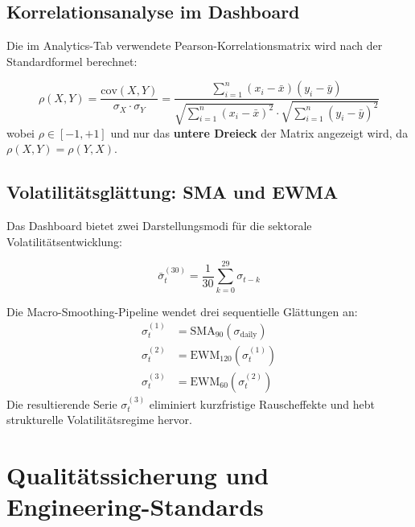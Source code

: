 \documentclass[12pt, a4paper, oneside]{report}
\begin{document}
\section{Korrelationsanalyse im Dashboard}

Die im Analytics-Tab verwendete Pearson-Korrelationsmatrix wird nach der Standardformel berechnet:

\begin{mathbox}
\[
  \rho(X, Y) = \frac{\text{cov}(X, Y)}{\sigma_X \cdot \sigma_Y} = \frac{\sum_{i=1}^{n}(x_i - \bar{x})(y_i - \bar{y})}{\sqrt{\sum_{i=1}^{n}(x_i - \bar{x})^2} \cdot \sqrt{\sum_{i=1}^{n}(y_i - \bar{y})^2}}
\]
wobei $\rho \in [-1, +1]$ und nur das \textbf{untere Dreieck} der Matrix angezeigt wird, da $\rho(X,Y) = \rho(Y,X)$.
\end{mathbox}

\section{Volatilitätsglättung: SMA und EWMA}

Das Dashboard bietet zwei Darstellungsmodi für die sektorale Volatilitätsentwicklung:

\begin{mathbox}
\[
  \bar{\sigma}_{t}^{(30)} = \frac{1}{30}\sum_{k=0}^{29} \sigma_{t-k}
\]
\end{mathbox}

\begin{mathbox}
Die Macro-Smoothing-Pipeline wendet drei sequentielle Glättungen an:
\begin{align}
  \sigma_t^{(1)} &= \text{SMA}_{90}(\sigma_{\text{daily}}) \\
  \sigma_t^{(2)} &= \text{EWM}_{120}\!\left(\sigma_t^{(1)}\right) \\
  \sigma_t^{(3)} &= \text{EWM}_{60}\!\left(\sigma_t^{(2)}\right)
\end{align}
Die resultierende Serie $\sigma_t^{(3)}$ eliminiert kurzfristige Rauscheffekte und hebt strukturelle Volatilitätsregime hervor.
\end{mathbox}

\chapter{Qualitätssicherung und Engineering-Standards}
\end{document}
